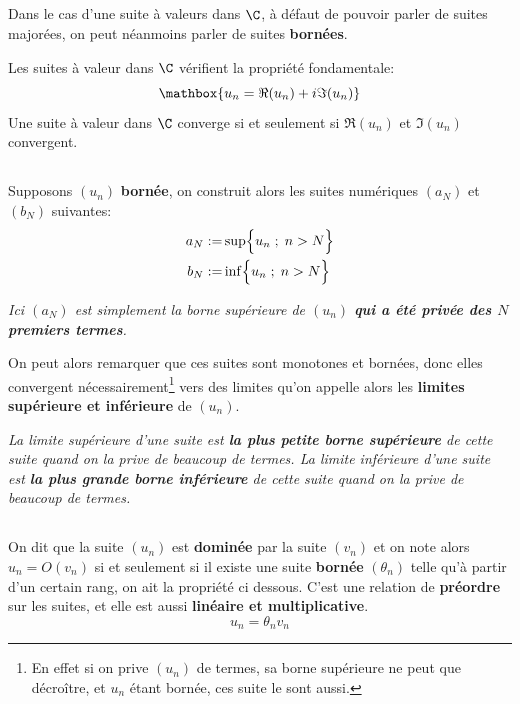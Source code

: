 \subsection*{}
Dans le cas d'une suite à valeurs dans \(\C\), à défaut de pouvoir parler de suites majorées, on peut néanmoins parler de suites \textbf{bornées}.\<

Les suites à valeur dans \(\C\) vérifient la propriété fondamentale:
\[
    \mathbox{
        u_n = \Re(u_n) + i\Im(u_n)
    }
\]
Une suite à valeur dans \(\C\) converge si et seulement si \(\Re(u_n)\) et \(\Im(u_n)\) convergent.

\subsection*{}
Supposons \((u_n)\) \textbf{bornée}, on construit alors les suites numériques \((a_N)\) et \((b_N)\) suivantes:
\begin{align*}
    a_N := &\sup\Bigl\{ u_n \; ; \; n > N \Bigl\} \\
    b_N := &\inf\Bigl\{ u_n \; ; \; n > N \Bigl\}
\end{align*}
\begin{center}
    \textit{
        Ici \((a_N)\) est simplement la borne supérieure de \((u_n)\) \textbf{qui a été privée des \(N\) premiers termes}.
    }
\end{center}
On peut alors remarquer que ces suites sont monotones et bornées, donc elles convergent nécessairement\footnote[1]{En effet si on prive \((u_n)\) de termes, sa borne supérieure ne peut que décroître, et \(u_n\) étant bornée, ces suite le sont aussi.} vers des limites qu'on appelle alors les \textbf{limites supérieure et inférieure} de \((u_n)\).

\begin{center}
    \textit{
        La limite supérieure d'une suite est \textbf{la plus petite borne supérieure} de cette suite quand on la prive de beaucoup de termes.\+
        La limite inférieure d'une suite est \textbf{la plus grande borne inférieure} de cette suite quand on la prive de beaucoup de termes.\+
    }
\end{center}

\subsection*{}

On dit que la suite \((u_n)\) est \textbf{dominée} par la suite \((v_n)\) et on note alors \(u_n = O(v_n)\) si et seulement si il existe une suite \textbf{bornée} \((\theta_n)\) telle qu'à partir d'un certain rang, on ait la propriété ci dessous.\+
C'est une relation de \textbf{préordre} sur les suites, et elle est aussi \textbf{linéaire et multiplicative}.
\[
    u_n = \theta_n v_n
\]


